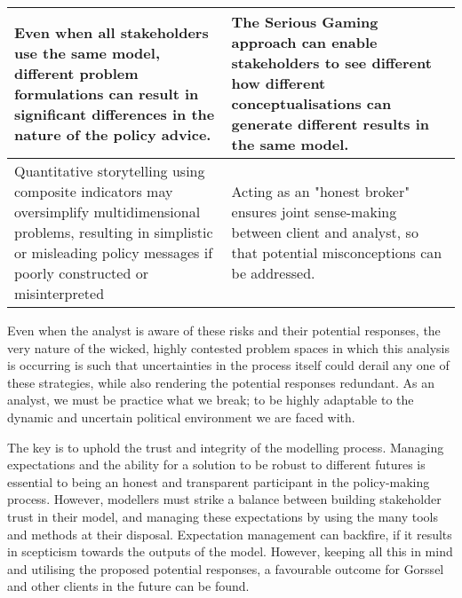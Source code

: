 \begin{table}[h!]
\begin{tabular}{p{}|p{}}
   \\ \hline
Even when all stakeholders use the same model, different problem formulations can result in significant differences in the nature of the policy advice. &  
  The Serious Gaming approach can enable stakeholders to see different how different conceptualisations can generate different results in the same model. \\ \hline
Quantitative storytelling using composite indicators may oversimplify multidimensional problems, resulting in simplistic or misleading policy messages if poorly constructed or misinterpreted & Acting as an "honest broker" ensures joint sense-making between client and analyst, so that potential misconceptions can be addressed.\\ \hline
  
\end{tabular}
\end{table}

Even when the analyst is aware of these risks and their potential responses, the very nature of the wicked, highly contested problem spaces in which this analysis is occurring is such that uncertainties in the process itself could derail any one of these strategies, while also rendering the potential responses redundant. As an analyst, we must be practice what we break; to be highly adaptable to the dynamic and uncertain political environment we are faced with. 

The key is to uphold the trust and integrity of the modelling process. Managing expectations and the ability for a solution to be robust to different futures is essential to being an honest and transparent participant in the policy-making process. However, modellers must strike a balance between building stakeholder trust in their model, and managing these expectations by using the many tools and methods at their disposal. Expectation management can backfire, if it results in scepticism towards the outputs of the model. However, keeping all this in mind and utilising the proposed potential responses, a favourable outcome for Gorssel and other clients in the future can be found.